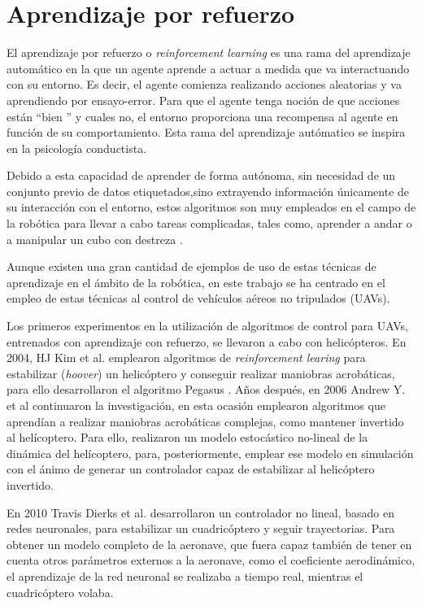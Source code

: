\section{Aprendizaje por refuerzo}
El aprendizaje por refuerzo o \textit{reinforcement learning} es una rama del aprendizaje automático en  la que un agente aprende a actuar a medida que va interactuando con su entorno. Es decir, el agente comienza realizando acciones aleatorias y va aprendiendo por ensayo-error. Para que el agente tenga noción de que acciones están ``bien '' y cuales no, el entorno proporciona una recompensa al agente en función de su comportamiento. Esta rama del aprendizaje autómatico se inspira en la psicología conductista.

Debido a esta capacidad de aprender de forma autónoma, sin necesidad de un conjunto previo de datos etiquetados,sino extrayendo información únicamente de su interacción con el entorno, estos algoritmos son muy empleados en el campo de la robótica para llevar a cabo tareas complicadas, tales como, aprender a andar o a manipular un cubo con destreza .

Aunque existen una gran cantidad de ejemplos de uso de estas técnicas de aprendizaje en el ámbito de la robótica, en este trabajo se ha centrado en el empleo de estas técnicas al control de vehículos aéreos no tripulados (UAVs).

Los primeros experimentos en la utilización de algoritmos de control para UAVs, entrenados con aprendizaje con refuerzo, se llevaron a cabo con helicópteros. En 2004, HJ Kim et al. \cite{kim2004autonomous} emplearon algoritmos de \textit{reinforcement learing} para estabilizar (\textit{hoover}) un helicóptero y conseguir realizar maniobras acrobáticas, para ello desarrollaron el algoritmo Pegasus . Años después, en 2006 Andrew Y. et al \cite{ng2006autonomous} continuaron la investigación, en esta ocasión emplearon algoritmos que aprendían a realizar maniobras acrobáticas complejas, como mantener invertido al helícoptero. Para ello, realizaron un modelo estocástico no-lineal de la dinámica del helícoptero, para, posteriormente, emplear ese modelo en simulación con el ánimo de generar un controlador capaz de estabilizar al helicóptero invertido.

En 2010 Travis Dierks et al. \cite{dierks2010output} desarrollaron un controlador no lineal, basado en redes neuronales, para estabilizar un cuadricóptero y seguir trayectorias. Para obtener un modelo completo de la aeronave, que fuera capaz también de tener en cuenta otros parámetros externos a la aeronave, como el coeficiente aerodinámico, el aprendizaje de la red neuronal se realizaba a tiempo real, mientras el cuadricóptero volaba. 


